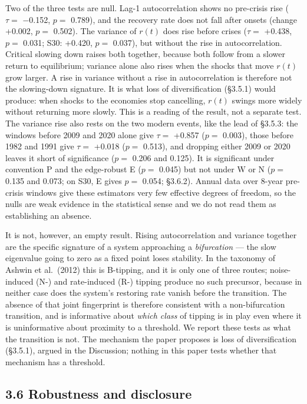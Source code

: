 \documentclass[11pt,a4paper]{article}
\begin{document}
Two of the three tests are null. Lag-1 autocorrelation shows no pre-crisis rise (\(\tau =\) −0.152, \(p =\) 0.789), and the recovery rate does not fall after onsets (change +0.002, \(p =\) 0.502). The variance of \(r(t)\) does rise before crises (\(\tau =\) +0.438, \(p =\) 0.031; S30: +0.420, \(p =\) 0.037), but without the rise in autocorrelation. Critical slowing down raises both together, because both follow from a slower return to equilibrium; variance alone also rises when the shocks that move \(r(t)\) grow larger. A rise in variance without a rise in autocorrelation is therefore not the slowing-down signature. It is what loss of diversification (§3.5.1) would produce: when shocks to the economies stop cancelling, \(r(t)\) swings more widely without returning more slowly. This is a reading of the result, not a separate test. The variance rise also rests on the two modern events, like the lead of §3.5.3: the windows before 2009 and 2020 alone give \(\tau =\) +0.857 (\(p =\) 0.003), those before 1982 and 1991 give \(\tau =\) +0.018 (\(p =\) 0.513), and dropping either 2009 or 2020 leaves it short of significance (\(p =\) 0.206 and 0.125). It is significant under convention P and the edge-robust E (\(p =\) 0.045) but not under W or N (\(p =\) 0.135 and 0.073; on S30, E gives \(p =\) 0.054; §3.6.2). Annual data over 8-year pre-crisis windows give these estimators very few effective degrees of freedom, so the nulls are weak evidence in the statistical sense and we do not read them as establishing an absence.

It is not, however, an empty result. Rising autocorrelation and variance together are the specific signature of a system approaching a \emph{bifurcation} — the slow eigenvalue going to zero as a fixed point loses stability. In the taxonomy of Ashwin et al.~(2012) this is B-tipping, and it is only one of three routes; noise-induced (N-) and rate-induced (R-) tipping produce no such precursor, because in neither case does the system's restoring rate vanish before the transition. The absence of that joint fingerprint is therefore consistent with a non-bifurcation transition, and is informative about \emph{which class} of tipping is in play even where it is uninformative about proximity to a threshold. We report these tests as what the transition is not. The mechanism the paper proposes is loss of diversification (§3.5.1), argued in the Discussion; nothing in this paper tests whether that mechanism has a threshold.

\subsection{3.6 Robustness and disclosure}\label{robustness-and-disclosure}
\end{document}
